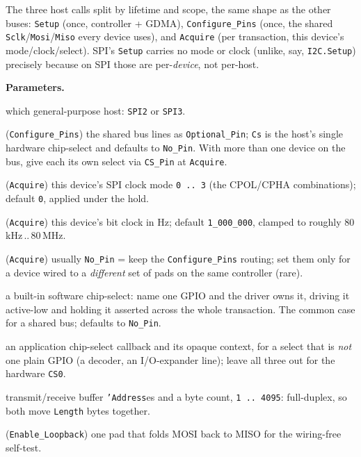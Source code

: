 The three host calls split by lifetime and scope, the same shape as the other
buses: \texttt{Setup} (once, controller + GDMA), \texttt{Configure\_Pins} (once,
the shared \texttt{Sclk}/\texttt{Mosi}/\texttt{Miso} every device uses), and
\texttt{Acquire} (per transaction, this device's mode/clock/select). SPI's
\texttt{Setup} carries no mode or clock (unlike, say, \texttt{I2C.Setup})
precisely because on SPI those are per-\emph{device}, not per-host.

\textbf{Parameters.}
\begin{description}[style=nextline]
\item[\texttt{Host}] which general-purpose host: \texttt{SPI2} or \texttt{SPI3}.
\item[\texttt{Sclk}, \texttt{Mosi}, \texttt{Miso}, \texttt{Cs}] (\texttt{Configure\_Pins})
  the shared bus lines as \texttt{Optional\_Pin}; \texttt{Cs} is the host's single
  hardware chip-select and defaults to \texttt{No\_Pin}. With more than one device
  on the bus, give each its own select via \texttt{CS\_Pin} at \texttt{Acquire}.
\item[\texttt{Mode}] (\texttt{Acquire}) this device's SPI clock mode \texttt{0\,..\,3}
  (the CPOL/CPHA combinations); default \texttt{0}, applied under the hold.
\item[\texttt{Clock\_Hz}] (\texttt{Acquire}) this device's bit clock in Hz; default
  \texttt{1\_000\_000}, clamped to roughly 80\,kHz\,..\,80\,MHz.
\item[\texttt{Sclk}, \texttt{Mosi}, \texttt{Miso}] (\texttt{Acquire}) usually
  \texttt{No\_Pin} = keep the \texttt{Configure\_Pins} routing; set them only for a
  device wired to a \emph{different} set of pads on the same controller (rare).
\item[\texttt{CS\_Pin}] a built-in software chip-select: name one GPIO and the
  driver owns it, driving it active-low and holding it asserted across the whole
  transaction. The common case for a shared bus; defaults to \texttt{No\_Pin}.
\item[\texttt{Select\_CB}, \texttt{Ctx}] an application chip-select callback and its
  opaque context, for a select that is \emph{not} one plain GPIO (a decoder, an
  I/O-expander line); leave all three out for the hardware \texttt{CS0}.
\item[\texttt{Tx}, \texttt{Rx}, \texttt{Length}] transmit/receive buffer
  \texttt{'Address}es and a byte count, \texttt{1\,..\,4095}: full-duplex, so both
  move \texttt{Length} bytes together.
\item[\texttt{Pad}] (\texttt{Enable\_Loopback}) one pad that folds MOSI back to MISO
  for the wiring-free self-test.
\end{description}

